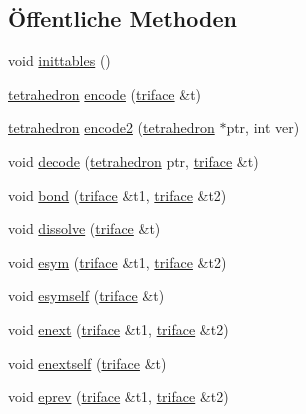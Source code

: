 \subsection*{Öffentliche Methoden}
\begin{DoxyCompactItemize}
\item 
void \hyperlink{classtetgenmesh_af1a7205fe0e5e6256f301e6c47b752b6}{inittables} ()
\item 
\hyperlink{classtetgenmesh_a6a12b1c0d1834ca941d16c62e949e5e3}{tetrahedron} \hyperlink{classtetgenmesh_a7c32f356cc7f0e57f442f9dac4fccb8a}{encode} (\hyperlink{classtetgenmesh_1_1triface}{triface} \&t)
\item 
\hyperlink{classtetgenmesh_a6a12b1c0d1834ca941d16c62e949e5e3}{tetrahedron} \hyperlink{classtetgenmesh_a2bc1e8e424ea557d033135dafcf165bb}{encode2} (\hyperlink{classtetgenmesh_a6a12b1c0d1834ca941d16c62e949e5e3}{tetrahedron} $\ast$ptr, int ver)
\item 
void \hyperlink{classtetgenmesh_a809cfdec35ae9a52670e045823a302c0}{decode} (\hyperlink{classtetgenmesh_a6a12b1c0d1834ca941d16c62e949e5e3}{tetrahedron} ptr, \hyperlink{classtetgenmesh_1_1triface}{triface} \&t)
\item 
void \hyperlink{classtetgenmesh_ad7b47aeb5b8d5ab677d86fcafa619a35}{bond} (\hyperlink{classtetgenmesh_1_1triface}{triface} \&t1, \hyperlink{classtetgenmesh_1_1triface}{triface} \&t2)
\item 
void \hyperlink{classtetgenmesh_ac0e0919c3b91b0e55dadbdaae2554074}{dissolve} (\hyperlink{classtetgenmesh_1_1triface}{triface} \&t)
\item 
void \hyperlink{classtetgenmesh_a523cfafc3be8e0ead97a13707b33e4b3}{esym} (\hyperlink{classtetgenmesh_1_1triface}{triface} \&t1, \hyperlink{classtetgenmesh_1_1triface}{triface} \&t2)
\item 
void \hyperlink{classtetgenmesh_a9c4f9877ba70f7c0f399b7fcdd8fdddf}{esymself} (\hyperlink{classtetgenmesh_1_1triface}{triface} \&t)
\item 
void \hyperlink{classtetgenmesh_acf741079840d587ec0d71354cea6e6cf}{enext} (\hyperlink{classtetgenmesh_1_1triface}{triface} \&t1, \hyperlink{classtetgenmesh_1_1triface}{triface} \&t2)
\item 
void \hyperlink{classtetgenmesh_a1c65efaf2a8a72d023327c2592d89188}{enextself} (\hyperlink{classtetgenmesh_1_1triface}{triface} \&t)
\item 
void \hyperlink{classtetgenmesh_a5f04514ee657caf3131156a233e713c8}{eprev} (\hyperlink{classtetgenmesh_1_1triface}{triface} \&t1, \hyperlink{classtetgenmesh_1_1triface}{triface} \&t2)

\end{DoxyCompactItemize}
